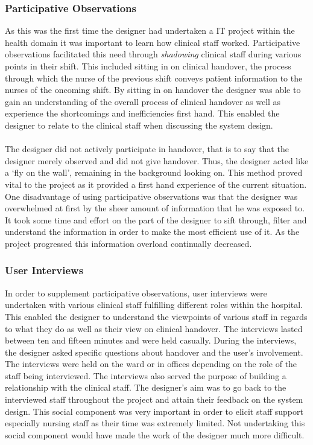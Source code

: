 \subsubsection{Participative Observations}
As this was the first time the designer had undertaken a IT project within the health domain it was important to learn how clinical staff worked. Participative observations facilitated this need through \emph{shadowing} clinical staff during various points in their shift. This included sitting in on clinical handover, the process through which the nurse of the previous shift conveys patient information to the nurses of the oncoming shift. By sitting in on handover the designer was able to gain an understanding of the overall process of clinical handover as well as experience the shortcomings and inefficiencies first hand. This enabled the designer to relate to the clinical staff when discussing the system design. 
\\ \\
The designer did not actively participate in handover, that is to say that the designer merely observed and did not give handover. Thus, the designer acted like a `fly on the wall', remaining in the background looking on. This method proved vital to the project as it provided a first hand experience of the current situation. One disadvantage of using participative observations was that the designer was overwhelmed at first by the sheer amount of information that he was exposed to. It took some time and effort on the part of the designer to sift through, filter and understand the information in order to make the most efficient use of it. As the project progressed this information overload continually decreased.

\subsubsection{User Interviews}
In order to supplement participative observations, user interviews were undertaken with various clinical staff fulfilling different roles within the hospital. This enabled the designer to understand the viewpoints of various staff in regards to what they do as well as their view on clinical handover. The interviews lasted between ten and fifteen minutes and were held casually. During the interviews, the designer asked specific questions about handover and the user's involvement. The interviews were held on the ward or in offices depending on the role of the staff being interviewed. The interviews also served the purpose of building a relationship with the clinical staff. The designer's aim was to go back to the interviewed staff throughout the project and attain their feedback on the system design. This social component was very important in order to elicit staff support especially nursing staff as their time was extremely limited. Not undertaking this social component would have made the work of the designer much more difficult.

